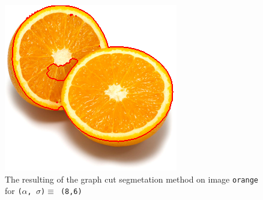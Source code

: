 {\begin{minipage}{0.45\linewidth}
    \vfill
    \begin{figure}[H]
      \includegraphics[scale=0.5]{./images/04/Q11/var_a_b/orange/graphcut2_a8_s6.png}
      \caption{The resulting of the graph cut segmetation method on image \texttt{orange} for
        \texttt{($\alpha$, $\sigma$)$ \equiv$ (8,6)}}
      \label{fig:04_orange2_a8_s6}
    \end{figure}
  \end{minipage}
}


